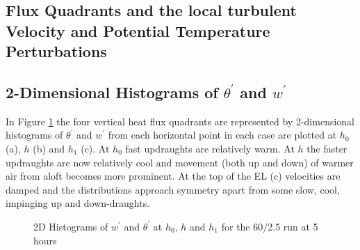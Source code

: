 
\clearpage

\subsection{Flux Quadrants and the local turbulent Velocity and Potential Temperature Perturbations}
\label{subsec:fluxquadrants}     
\FloatBarrier
\subsection{2-Dimensional Histograms of $\theta^{'}$ and $w^{'}$}

In Figure \ref{fig:flqdhsts} the four vertical heat flux quadrants are represented by 2-dimensional histograms of $\theta^{'}$ and $w^{'}$ from each horizontal point in each case are plotted at $h_{0}$ (a), $h$ (b) and $h_{1}$ (c). At $h_{0}$ fast updraughts are relatively warm.  At $h$ the faster updraughts are now relatively cool and movement (both up and down) of warmer air from aloft becomes more prominent. At the top of the \acs{EL} (c) velocities are damped and the distributions approach symmetry apart from some slow, cool, impinging up and down-draughts.\\

\begin{figure}[htbp]
\caption[2D distributions of $w^{'}$ and $\theta^{'}$]{2D Histograms of $w^{'}$ and $\theta^{'}$ at $h_{0}$, $h$ and $h_{1}$ for the 60/2.5 run at 5 hours}        
        \label{fig:flqdhsts}
\end{figure}

